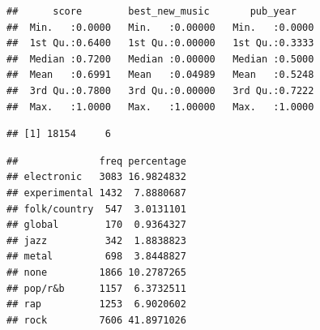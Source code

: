 \documentclass{article}
\begin{document}
\begin{verbatim}
##      score        best_new_music       pub_year     
##  Min.   :0.0000   Min.   :0.00000   Min.   :0.0000  
##  1st Qu.:0.6400   1st Qu.:0.00000   1st Qu.:0.3333  
##  Median :0.7200   Median :0.00000   Median :0.5000  
##  Mean   :0.6991   Mean   :0.04989   Mean   :0.5248  
##  3rd Qu.:0.7800   3rd Qu.:0.00000   3rd Qu.:0.7222  
##  Max.   :1.0000   Max.   :1.00000   Max.   :1.0000
\end{verbatim}

\begin{verbatim}
## [1] 18154     6
\end{verbatim}

\begin{verbatim}
##              freq percentage
## electronic   3083 16.9824832
## experimental 1432  7.8880687
## folk/country  547  3.0131101
## global        170  0.9364327
## jazz          342  1.8838823
## metal         698  3.8448827
## none         1866 10.2787265
## pop/r&b      1157  6.3732511
## rap          1253  6.9020602
## rock         7606 41.8971026
\end{verbatim}
\end{document}
